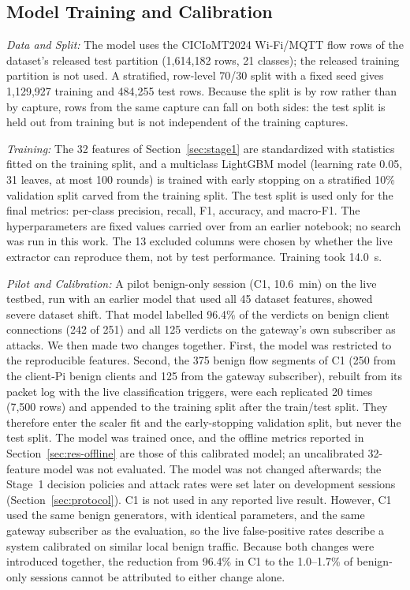 \documentclass[journal]{IEEEtran}
\begin{document}
\subsection{Model Training and Calibration}
\label{sec:training}

\textit{Data and Split:} The model uses the CICIoMT2024 Wi-Fi/MQTT flow rows of the dataset's released test partition (1,614,182 rows, 21 classes); the released training partition is not used. A stratified, row-level 70/30 split with a fixed seed gives 1,129,927 training and 484,255 test rows. Because the split is by row rather than by capture, rows from the same capture can fall on both sides: the test split is held out from training but is not independent of the training captures.

\textit{Training:} The 32 features of Section~\ref{sec:stage1} are standardized with statistics fitted on the training split, and a multiclass LightGBM model (learning rate 0.05, 31 leaves, at most 100 rounds) is trained with early stopping on a stratified 10\% validation split carved from the training split. The test split is used only for the final metrics: per-class precision, recall, F1, accuracy, and macro-F1. The hyperparameters are fixed values carried over from an earlier notebook; no search was run in this work. The 13 excluded columns were chosen by whether the live extractor can reproduce them, not by test performance. Training took 14.0~s.

\textit{Pilot and Calibration:} A pilot benign-only session (C1, 10.6~min) on the live testbed, run with an earlier model that used all 45 dataset features, showed severe dataset shift. That model labelled 96.4\% of the verdicts on benign client connections (242 of 251) and all 125 verdicts on the gateway's own subscriber as attacks. We then made two changes together. First, the model was restricted to the reproducible features. Second, the 375 benign flow segments of C1 (250 from the client-Pi benign clients and 125 from the gateway subscriber), rebuilt from its packet log with the live classification triggers, were each replicated 20 times (7,500 rows) and appended to the training split after the train/test split. They therefore enter the scaler fit and the early-stopping validation split, but never the test split. The model was trained once, and the offline metrics reported in Section~\ref{sec:res-offline} are those of this calibrated model; an uncalibrated 32-feature model was not evaluated. The model was not changed afterwards; the Stage~1 decision policies and attack rates were set later on development sessions (Section~\ref{sec:protocol}). C1 is not used in any reported live result. However, C1 used the same benign generators, with identical parameters, and the same gateway subscriber as the evaluation, so the live false-positive rates describe a system calibrated on similar local benign traffic. Because both changes were introduced together, the reduction from 96.4\% in C1 to the 1.0--1.7\% of benign-only sessions cannot be attributed to either change alone.
\end{document}
